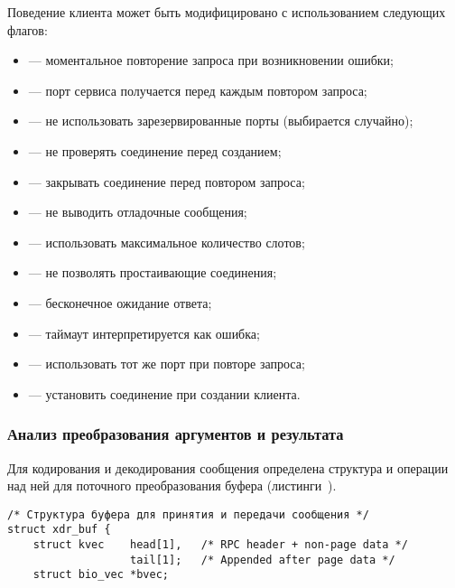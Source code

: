 Поведение клиента может быть модифицировано с использованием следующих флагов:
\begin{itemize}
    \item {} --- моментальное повторение запроса
          при возникновении ошибки;
    \item {} --- порт сервиса получается перед
          каждым повтором запроса;
    \item {} --- не использовать
          зарезервированные порты (выбирается случайно);
    \item {} --- не проверять соединение перед
          созданием;
    \item {} --- закрывать соединение перед
          повтором запроса;
    \item {} --- не выводить отладочные сообщения;
    \item {} --- использовать максимальное
          количество слотов;
    \item {} --- не позволять простаивающие
          соединения;
    \item {} --- бесконечное ожидание
          ответа;
    \item {} --- таймаут интерпретируется как
          ошибка;
    \item {} --- использовать тот же порт при
          повторе запроса;
    \item {} --- установить соединение при
          создании клиента.
\end{itemize}

\subsubsection{Анализ преобразования аргументов и результата}

Для кодирования и декодирования сообщения определена структура и операции над
ней для поточного преобразования буфера
(листинги~).

\begin{lstlisting}[caption={Структура буфера (часть 1)}, label={lst:xdr1}]
/* Структура буфера для принятия и передачи сообщения */
struct xdr_buf {
    struct kvec    head[1],   /* RPC header + non-page data */
                   tail[1];   /* Appended after page data */
    struct bio_vec *bvec;
\end{lstlisting}

